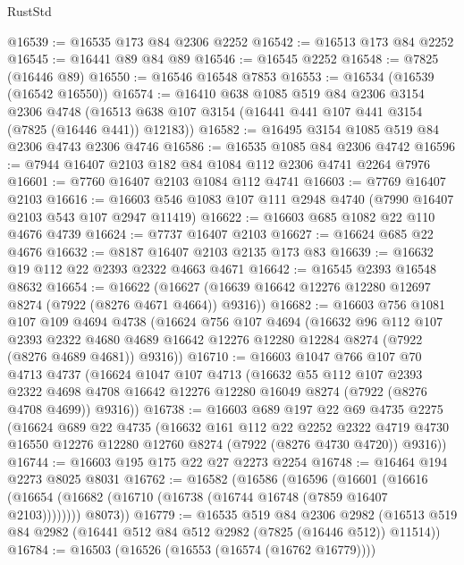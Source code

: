 \begin{lexlean}{RustStd}
\begin{coremodule}
@16539 := @16535 @173 @84 @2306 @2252
@16542 := @16513 @173 @84 @2252
@16545 := @16441 @89 @84 @89
@16546 := @16545 @2252
@16548 := @7825 (@16446 @89)
@16550 := @16546 @16548 @7853
@16553 := @16534 (@16539 (@16542 @16550))
@16574 := @16410
    @638
    @1085
    @519
    @84
    @2306
    @3154
    @2306
    @4748
    (@16513 @638 @107 @3154 (@16441 @441 @107 @441 @3154 (@7825 (@16446 @441)) @12183))
@16582 := @16495 @3154 @1085 @519 @84 @2306 @4743 @2306 @4746
@16586 := @16535 @1085 @84 @2306 @4742
@16596 := @7944 @16407 @2103 @182 @84 @1084 @112 @2306 @4741 @2264 @7976
@16601 := @7760 @16407 @2103 @1084 @112 @4741
@16603 := @7769 @16407 @2103
@16616 := @16603 @546 @1083 @107 @111 @2948 @4740 (@7990 @16407 @2103 @543 @107 @2947 @11419)
@16622 := @16603 @685 @1082 @22 @110 @4676 @4739
@16624 := @7737 @16407 @2103
@16627 := @16624 @685 @22 @4676
@16632 := @8187 @16407 @2103 @2135 @173 @83
@16639 := @16632 @19 @112 @22 @2393 @2322 @4663 @4671
@16642 := @16545 @2393 @16548 @8632
@16654 := @16622
    (@16627 (@16639 @16642 @12276 @12280 @12697 @8274 (@7922 (@8276 @4671 @4664)) @9316))
@16682 := @16603
    @756
    @1081
    @107
    @109
    @4694
    @4738
    (@16624
      @756
      @107
      @4694
      (@16632
        @96
        @112
        @107
        @2393
        @2322
        @4680
        @4689
        @16642
        @12276
        @12280
        @12284
        @8274
        (@7922 (@8276 @4689 @4681))
        @9316))
@16710 := @16603
    @1047
    @766
    @107
    @70
    @4713
    @4737
    (@16624
      @1047
      @107
      @4713
      (@16632
        @55
        @112
        @107
        @2393
        @2322
        @4698
        @4708
        @16642
        @12276
        @12280
        @16049
        @8274
        (@7922 (@8276 @4708 @4699))
        @9316))
@16738 := @16603
    @689
    @197
    @22
    @69
    @4735
    @2275
    (@16624
      @689
      @22
      @4735
      (@16632
        @161
        @112
        @22
        @2252
        @2322
        @4719
        @4730
        @16550
        @12276
        @12280
        @12760
        @8274
        (@7922 (@8276 @4730 @4720))
        @9316))
@16744 := @16603 @195 @175 @22 @27 @2273 @2254
@16748 := @16464 @194 @2273 @8025 @8031
@16762 := @16582
    (@16586
      (@16596
        (@16601 (@16616 (@16654 (@16682 (@16710 (@16738 (@16744 @16748 (@7859 @16407 @2103))))))))
        @8073))
@16779 := @16535
    @519
    @84
    @2306
    @2982
    (@16513 @519 @84 @2982 (@16441 @512 @84 @512 @2982 (@7825 (@16446 @512)) @11514))
@16784 := @16503 (@16526 (@16553 (@16574 (@16762 @16779))))

\end{coremodule}
\end{lexlean}
